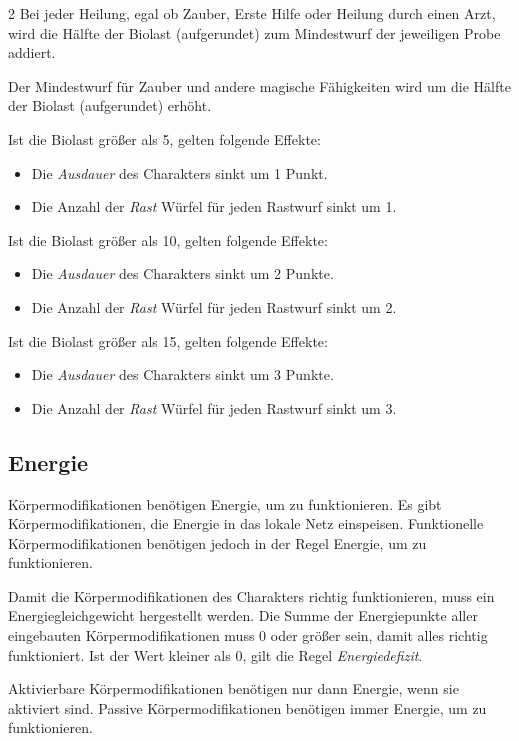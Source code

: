 \begin{multicols}{2}
Bei jeder Heilung, egal ob Zauber, Erste Hilfe oder Heilung durch einen Arzt, wird die Hälfte der Biolast (aufgerundet) zum Mindestwurf der jeweiligen Probe addiert.

Der Mindestwurf für Zauber und andere magische Fähigkeiten wird um die Hälfte der Biolast (aufgerundet) erhöht.

Ist die Biolast größer als 5, gelten folgende Effekte:
\begin{itemize}
    \item Die \textit{Ausdauer} des Charakters sinkt um 1 Punkt.
    \item Die Anzahl der \textit{Rast} Würfel für jeden Rastwurf sinkt um 1.
\end{itemize}

Ist die Biolast größer als 10, gelten folgende Effekte:
\begin{itemize}
    \item Die \textit{Ausdauer} des Charakters sinkt um 2 Punkte.
    \item Die Anzahl der \textit{Rast} Würfel für jeden Rastwurf sinkt um 2.
\end{itemize}

Ist die Biolast größer als 15, gelten folgende Effekte:
\begin{itemize}
    \item Die \textit{Ausdauer} des Charakters sinkt um 3 Punkte.
    \item Die Anzahl der \textit{Rast} Würfel für jeden Rastwurf sinkt um 3.
\end{itemize}

\subsection{Energie}

Körpermodifikationen benötigen Energie, um zu funktionieren. Es gibt Körpermodifikationen, die Energie in das lokale Netz einspeisen. Funktionelle Körpermodifikationen benötigen jedoch in der Regel Energie, um zu funktionieren.

Damit die Körpermodifikationen des Charakters richtig funktionieren, muss ein Energiegleichgewicht hergestellt werden. Die Summe der Energiepunkte aller eingebauten Körpermodifikationen muss 0 oder größer sein, damit alles richtig funktioniert. Ist der Wert kleiner als 0, gilt die Regel \textit{Energiedefizit}.

Aktivierbare Körpermodifikationen benötigen nur dann Energie, wenn sie aktiviert sind. Passive Körpermodifikationen benötigen immer Energie, um zu funktionieren.


\end{multicols}
